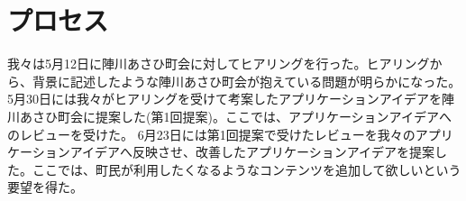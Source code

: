 
\section{プロセス}
我々は5月12日に陣川あさひ町会に対してヒアリングを行った。ヒアリングから、背景に記述したような陣川あさひ町会が抱えている問題が明らかになった。
5月30日には我々がヒアリングを受けて考案したアプリケーションアイデアを陣川あさひ町会に提案した(第1回提案)。ここでは、アプリケーションアイデアへのレビューを受けた。
6月23日には第1回提案で受けたレビューを我々のアプリケーションアイデアへ反映させ、改善したアプリケーションアイデアを提案した。ここでは、町民が利用したくなるようなコンテンツを追加して欲しいという要望を得た。
